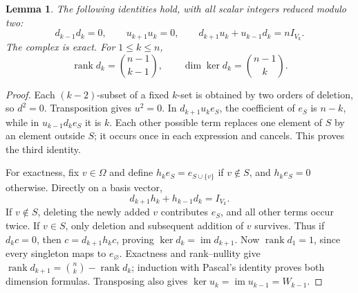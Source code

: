 \documentclass[11pt,a4paper]{article}
\newtheorem{lemma}[theorem]{Lemma}
\numberwithin{equation}{section}
\newcommand{\im}{\operatorname{im}}
\newcommand{\rank}{\operatorname{rank}}
\begin{document}
\begin{lemma}\label{ULCD.Simplex}
The following identities hold, with all scalar integers reduced modulo two:
\[
 d_{k-1}d_k=0,\qquad u_{k+1}u_k=0,\qquad
 d_{k+1}u_k+u_{k-1}d_k=nI_{V_k}.
\]
The complex is exact. For $1\leq k\leq n$,
\[
 \rank d_k=\binom{n-1}{k-1},\qquad
 \dim\ker d_k=\binom{n-1}{k}.
\]
\end{lemma}
\begin{proof}
Each $(k-2)$-subset of a fixed $k$-set is obtained by two orders of deletion,
so $d^2=0$. Transposition gives $u^2=0$. In $d_{k+1}u_ke_S$, the coefficient
of $e_S$ is $n-k$, while in $u_{k-1}d_ke_S$ it is $k$. Each other possible
term replaces one element of $S$ by an element outside $S$; it occurs once
in each expression and cancels. This proves the third identity.

For exactness, fix $v\in\Omega$ and define $h_ke_S=e_{S\cup\{v\}}$ if
$v\notin S$, and $h_ke_S=0$ otherwise. Directly on a basis vector,
\[
 d_{k+1}h_k+h_{k-1}d_k=I_{V_k}.
\]
If $v\notin S$, deleting the newly added $v$ contributes $e_S$, and all
other terms occur twice. If $v\in S$, only deletion and subsequent addition
of $v$ survives. Thus if $d_kc=0$, then $c=d_{k+1}h_kc$, proving
$\ker d_k=\im d_{k+1}$. Now $\rank d_1=1$, since every singleton maps
to $e_\varnothing$. Exactness and rank--nullity give
$\rank d_{k+1}=\binom nk-\rank d_k$; induction with Pascal's identity
proves both dimension formulas. Transposing also gives
$\ker u_k=\im u_{k-1}=W_{k-1}$.
\end{proof}
\end{document}

